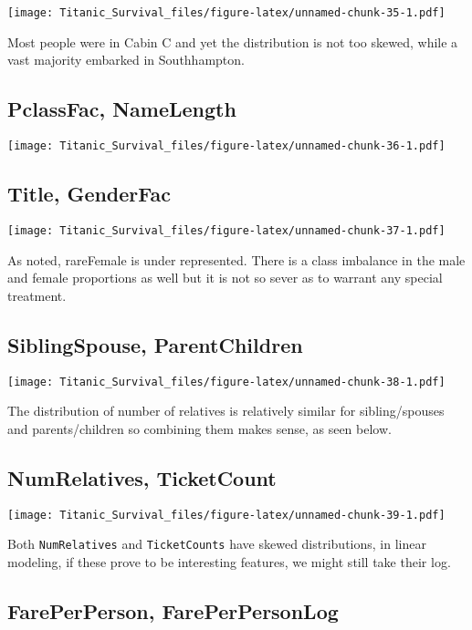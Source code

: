 \documentclass[]{article}
\begin{document}
\texttt{[image: Titanic\_Survival\_files/figure-latex/unnamed-chunk-35-1.pdf]}

Most people were in Cabin C and yet the distribution is not too skewed,
while a vast majority embarked in Southhampton.

\subsection{PclassFac, NameLength}\label{pclassfac-namelength}

\texttt{[image: Titanic\_Survival\_files/figure-latex/unnamed-chunk-36-1.pdf]}

\subsection{Title, GenderFac}\label{title-genderfac}

\texttt{[image: Titanic\_Survival\_files/figure-latex/unnamed-chunk-37-1.pdf]}

As noted, rareFemale is under represented. There is a class imbalance in
the male and female proportions as well but it is not so sever as to
warrant any special treatment.

\subsection{SiblingSpouse,
ParentChildren}\label{siblingspouse-parentchildren}

\texttt{[image: Titanic\_Survival\_files/figure-latex/unnamed-chunk-38-1.pdf]}

The distribution of number of relatives is relatively similar for
sibling/spouses and parents/children so combining them makes sense, as
seen below.

\subsection{NumRelatives, TicketCount}\label{numrelatives-ticketcount}

\texttt{[image: Titanic\_Survival\_files/figure-latex/unnamed-chunk-39-1.pdf]}

Both \texttt{NumRelatives} and \texttt{TicketCounts} have skewed
distributions, in linear modeling, if these prove to be interesting
features, we might still take their log.

\subsection{FarePerPerson,
FarePerPersonLog}\label{fareperperson-fareperpersonlog}
\end{document}
